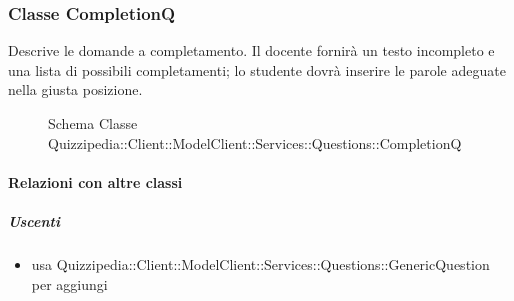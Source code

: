 \subsubsection{Classe CompletionQ}
Descrive le domande a completamento. Il docente fornirà un testo incompleto e una lista di possibili completamenti; lo studente dovrà inserire le parole adeguate nella giusta posizione.
\begin{figure}[H]
\centering
\noindent{}
\caption[Schema Classe CompletionQ]{Schema Classe Quizzipedia::Client::ModelClient::Services::Questions::CompletionQ}
\end{figure}
\paragraph{Relazioni con altre classi}
\subparagraph{Uscenti}
\begin{itemize}
\item usa Quizzipedia::Client::ModelClient::Services::Questions::GenericQuestion per aggiungi
\end{itemize}
